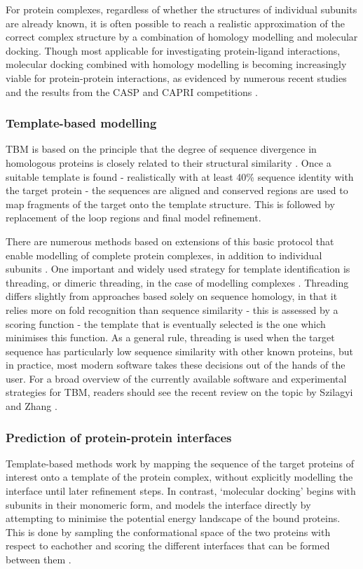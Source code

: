 \documentclass[a4paper,11pt,twoside,openright]{scrbook}
\begin{document}
For protein complexes, regardless of whether the structures of individual subunits are already known, it is often possible to reach a realistic approximation of the correct complex structure by a combination of homology modelling and molecular docking. Though most applicable for investigating protein-ligand interactions, molecular docking combined with homology modelling is becoming increasingly viable for protein-protein interactions, as evidenced by numerous recent studies and the results from the CASP and CAPRI competitions \cite{Jiang2013,Rajapaksha2014,Agostino2016,Lensink2016}.

\subsubsection{Template-based modelling}
TBM is based on the principle that the degree of sequence divergence in homologous proteins is closely related to their structural similarity \cite{Chothia1986}. Once a suitable template is found - realistically with at least 40\% sequence identity with the target protein - the sequences are aligned and conserved regions are used to map fragments of the target onto the template structure. This is followed by replacement of the loop regions and final model refinement.

There are numerous methods based on extensions of this basic protocol that enable modelling of complete protein complexes, in addition to individual subunits \cite{Chen2008,Tuncbag2011,Guerler2013}. One important and widely used strategy for template identification is threading, or dimeric threading, in the case of modelling complexes \cite{Bowie1991,Lu2002}. Threading differs slightly from approaches based solely on sequence homology, in that it relies more on fold recognition than sequence similarity - this is assessed by a scoring function - the template that is eventually selected is the one which minimises this function. As a general rule, threading is used when the target sequence has particularly low sequence similarity with other known proteins, but in practice, most modern software takes these decisions out of the hands of the user. For a broad overview of the currently available software and experimental strategies for TBM, readers should see the recent review on the topic by Szilagyi and Zhang \cite{Szilagyi2014}.

\subsubsection{Prediction of protein-protein interfaces}
Template-based methods work by mapping the sequence of the target proteins of interest onto a template of the protein complex, without explicitly modelling the interface until later refinement steps. In contrast, `molecular docking' begins with subunits in their monomeric form, and models the interface directly by attempting to minimise the potential energy landscape of the bound proteins. This is done by sampling the conformational space of the two proteins with respect to eachother and scoring the different interfaces that can be formed between them \cite{Huang2014}.
\end{document}
